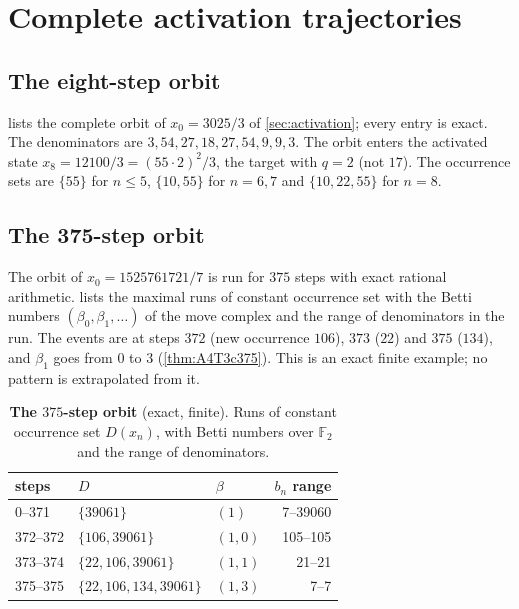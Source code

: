\section{Complete activation trajectories}\label{app:trajectories}
\subsection{The eight-step orbit}
 lists the complete orbit of $x_0=3025/3$ of \cref{sec:activation}; every entry is exact. The denominators are $3,54,27,18,27,54,9,9,3$. The orbit enters the activated state $x_8=12100/3=(55\cdot2)^2/3$, the target with $q=2$ (not $17$). The occurrence sets are $\{55\}$ for $n\le5$, $\{10,55\}$ for $n=6,7$ and $\{10,22,55\}$ for $n=8$.
\subsection{The 375-step orbit}
The orbit of $x_0=1525761721/7$ is run for $375$ steps with exact rational arithmetic.  lists the maximal runs of constant occurrence set with the Betti numbers $(\beta_0,\beta_1,\dots)$ of the move complex and the range of denominators in the run. The events are at steps $372$ (new occurrence $106$), $373$ ($22$) and $375$ ($134$), and $\beta_1$ goes from $0$ to $3$ (\cref{thm:A4T3c375}). This is an exact finite example; no pattern is extrapolated from it.
\begin{table}[tbp]\centering\small
\begin{tabular}{@{}lllr@{}}\toprule
steps & $D$ & $\beta$ & $b_n$ range\\\midrule
0--371 & $\{39061\}$ & $(1)$ & 7--39060\\
372--372 & $\{106,39061\}$ & $(1,0)$ & 105--105\\
373--374 & $\{22,106,39061\}$ & $(1,1)$ & 21--21\\
375--375 & $\{22,106,134,39061\}$ & $(1,3)$ & 7--7\\
\bottomrule\end{tabular}
\caption{\textbf{The $375$-step orbit} (exact, finite). Runs of constant occurrence set $D(x_n)$, with Betti numbers over $\mathbb F_2$ and the range of denominators.}\label{tab:t375}
\end{table}
